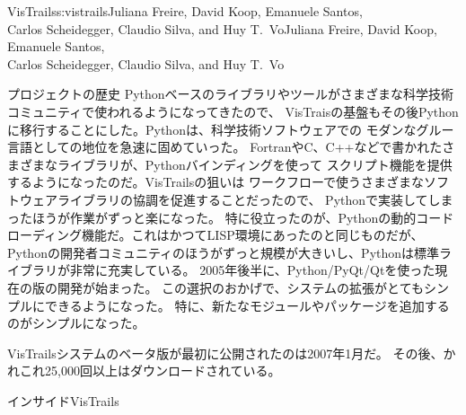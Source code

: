 \begin{aosachaptertoc}{VisTrails}{s:vistrails}{Juliana Freire, David Koop, Emanuele Santos, \\ Carlos Scheidegger, Claudio Silva, and Huy T.\ Vo}{Juliana Freire, David Koop, Emanuele Santos, \\ \hspace*{0.9cm} Carlos Scheidegger, Claudio Silva, and Huy T.\ Vo}
\begin{aosasect1}{プロジェクトの歴史}
Pythonベースのライブラリやツールがさまざまな科学技術コミュニティで使われるようになってきたので、
VisTraisの基盤もその後Pythonに移行することにした。Pythonは、科学技術ソフトウェアでの
モダンなグルー言語としての地位を急速に固めていった。
FortranやC、C++などで書かれたさまざまなライブラリが、Pythonバインディングを使って
スクリプト機能を提供するようになったのだ。VisTrailsの狙いは
ワークフローで使うさまざまなソフトウェアライブラリの協調を促進することだったので、
Pythonで実装してしまったほうが作業がずっと楽になった。
特に役立ったのが、Pythonの動的コードローディング機能だ。これはかつてLISP環境にあったのと同じものだが、
Pythonの開発者コミュニティのほうがずっと規模が大きいし、Pythonは標準ライブラリが非常に充実している。
2005年後半に、Python/PyQt/Qtを使った現在の版の開発が始まった。
この選択のおかげで、システムの拡張がとてもシンプルにできるようになった。
特に、新たなモジュールやパッケージを追加するのがシンプルになった。

VisTrailsシステムのベータ版が最初に公開されたのは2007年1月だ。
その後、かれこれ25,000回以上はダウンロードされている。

\end{aosasect1}

\begin{aosasect1}{インサイドVisTrails}


\end{aosasect1}
\end{aosachaptertoc}
